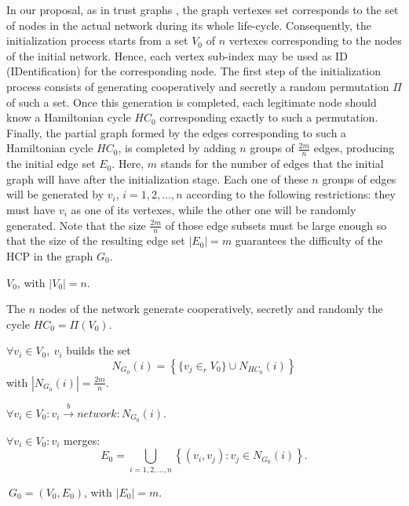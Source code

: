 \documentclass[conference]{IEEEtran}
\begin{document}
In our proposal, as in trust graphs \cite{JB}, the graph vertexes set corresponds to the set of nodes in the actual network during its whole life-cycle. Consequently, the initialization process starts from a set $V_{0}$ of $n$
vertexes corresponding to the nodes of the initial network.
Hence, each vertex sub-index may be used as ID
(IDentification) for the corresponding node. The first step of the
initialization process consists of generating cooperatively and secretly
a random permutation $\Pi$ of such a set. Once this generation is
completed, each legitimate node should know a Hamiltonian cycle
$HC_{0}$ corresponding exactly to such a permutation. Finally, the
partial graph formed by the edges corresponding to such a
Hamiltonian cycle $HC_0$, is completed by adding $n$ groups of
$\frac{2m}{n}$ edges, producing the initial edge set $E_0$. Here, $m$ stands for the number of edges that the initial graph will have after the initialization stage. Each one of these $n$ groups of edges will be generated by $v_i$, $i=1,2,...,n$ according to the following restrictions: they must have $v_i$ as one of its vertexes,
while the other one will be randomly generated. Note
that the size $\frac{2m}{n}$ of those edge subsets must
be large enough so that the size of the resulting edge set
$\left|E_{0}\right| = m$ guarantees the difficulty of the HCP in
the graph $G_0$.

\begin{description}
\item [Input:] $V_{0}$, with $\left|V_{0}\right| = n$.


\item [1.]The  $ n $ nodes of the network generate cooperatively, secretly and randomly the cycle $HC_{0}=\Pi\left(V_{0}\right)$.

\item [2.] $\forall v_i \in V_{0},\ v_i$ builds the set $$N_{G_{0}}(i) =\left\{   \{v_j \in_r V_{0}\} \cup N_{HC_0}(i)\right\}$$ with $\left|N_{G_{0}}(i)\right| = \frac{2m}{n}$.

\item [3.] $\forall v_i \in V_{0}: v_i \stackrel{b}{\rightarrow} network: N_{G_{0}}(i) $.

\item [4.] $\forall v_i \in V_{0}: v_i$ merges: $$ E_{0}= \bigcup _{i=1,2,...,n} \left\{ (v_i, v_j) : v_j \in N_{G_{0}}(i) \right \}.$$


 \item [Output: ] $\ G_{0} = (V_{0}, E_{0})$, with $\left|E_{0}\right| = m $.
\end{description}
\end{document}
